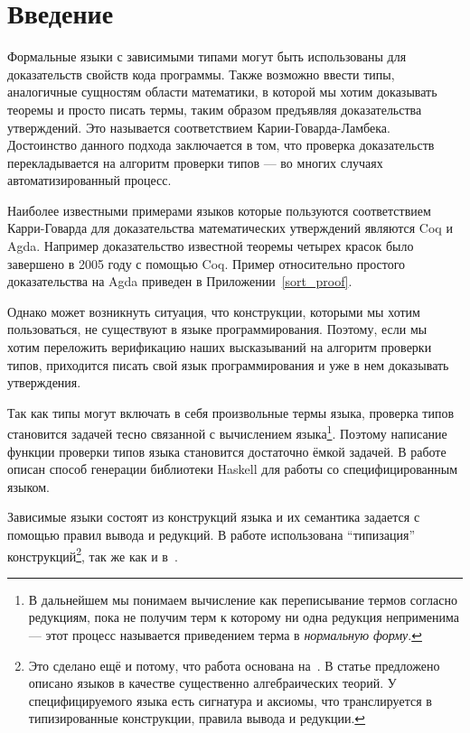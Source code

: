\section*{Введение}
Формальные языки с зависимыми типами могут быть использованы для доказательств свойств кода программы. Также возможно ввести типы, аналогичные сущностям области математики, в которой мы хотим доказывать теоремы и просто писать термы, таким образом предъявляя доказательства утверждений. Это называется соответствием Карии-Говарда-Ламбека\cite{curry_how}. Достоинство данного подхода заключается в том, что проверка доказательств перекладывается на алгоритм проверки типов --- во многих случаях автоматизированный процесс.

Наиболее известными примерами языков которые пользуются соответствием Карри-Говарда для доказательства математических утверждений являются Coq\cite{coq} и Agda\cite{agda}. Например доказательство известной теоремы четырех красок было завершено в 2005 году с помощью Coq\cite{weisstein2002four}.
Пример относительно простого доказательства на Agda приведен в Приложении~\ref{sort_proof}.

Однако может возникнуть ситуация, что конструкции, которыми мы хотим пользоваться, не существуют в языке программирования. Поэтому, если мы хотим переложить верификацию наших высказываний на алгоритм проверки типов, приходится писать свой язык программирования и уже в нем доказывать утверждения.

Так как типы могут включать в себя произвольные термы языка, проверка типов становится задачей тесно связанной с вычислением языка\footnote{В дальнейшем мы понимаем вычисление как переписывание термов согласно редукциям, пока не получим терм к которому ни одна редукция неприменима --- этот процесс называется приведением терма в \textit{нормальную форму}.}. Поэтому написание функции проверки типов языка становится достаточно ёмкой задачей. В работе описан способ генерации библиотеки Haskell\cite{haskell} для работы со специфицированным языком.

\hfill

Зависимые языки состоят из конструкций языка и их семантика задается с помощью правил вывода и редукций. В работе использована ``типизация'' конструкций\footnote{Это сделано ещё и потому, что работа основана на~\cite{isaev}. В статье предложено описано языков в качестве существенно алгебраических теорий. У специфицируемого языка есть сигнатура и аксиомы, что транслируется в типизированные конструкции, правила вывода и редукции.}, так же как и в~\cite{twelf}.


